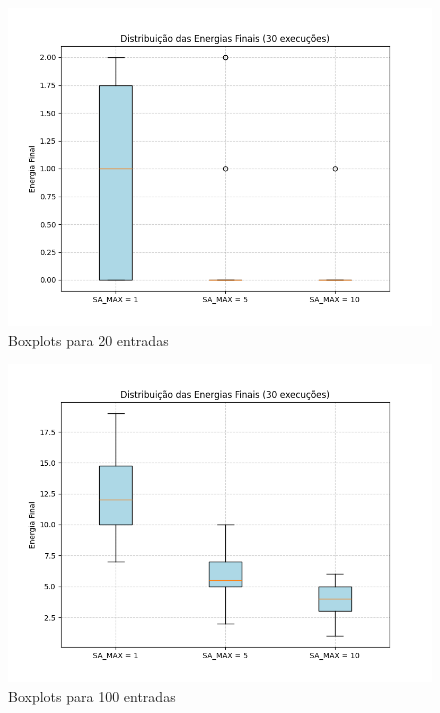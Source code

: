 \documentclass[12pt]{article}
\begin{document}
\begin{figure}[H]
  \centering
  \includegraphics[width=.9\textwidth]{../../boxplot_20.png}
  \caption{Boxplots para 20 entradas}
  \label{fig:metodologia}
  \end{figure}

\begin{figure}[H]
  \centering
  \includegraphics[width=.9\textwidth]{../../boxplot_100.png}
  \caption{Boxplots para 100 entradas}
  \label{fig:metodologia}
   \end{figure}
\end{document}
